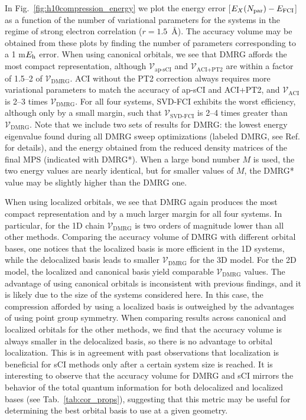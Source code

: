 \documentclass[aip,jcp,amsmath,amssymb, reprint]{revtex4-1}
\newcommand*{\Eh}{$E_{\rm h}$\xspace}
\begin{document}
In Fig.~\ref{fig:h10compression_energy} we plot the energy error [$E_X(N_{\rm{par}}) - E_\mathrm{FCI}$] as a function of the number of variational parameters for the  systems in the regime of strong electron correlation ($r=1.5$~{\AA}).
The accuracy volume may be obtained from these plots by finding the number of parameters corresponding to a 1 m\Eh error.
When using canonical orbitals, we see that DMRG affords the most compact representation, although $\mathcal{V}_{\text{ap-sCI}}$ and $\mathcal{V}_{\text{ACI+PT2}}$   are within a factor of 1.5--2 of $\mathcal{V}_{\text{DMRG}}$.
ACI without the PT2 correction always requires more variational parameters to match the accuracy of ap-sCI and ACI+PT2, and $\mathcal{V}_{\text{ACI}}$ is 2--3 times $\mathcal{V}_{\text{DMRG}}$.
For all four  systems, SVD-FCI exhibits the worst efficiency, although only by a small margin, such that $\mathcal{V}_{\text{SVD-FCI}}$ is 2--4 times greater than $\mathcal{V}_{\text{DMRG}}$.
Note that we include two sets of results for DMRG: the lowest energy eigenvalue found during all DMRG sweep optimizations (labeled DMRG, see Ref.  for details), and the energy obtained from the reduced density matrices of the final MPS (indicated with DMRG*). 
When a large bond number $M$ is used, the two energy values are nearly identical, but for smaller values of $M$, the DMRG* value may be slightly higher than the DMRG one.

When using localized orbitals, we see that DMRG again produces the most compact representation and by a much larger margin for all four  systems.  
In particular, for the 1D chain $\mathcal{V}_{\text{DMRG}}$ is two orders of magnitude lower than all other methods.
Comparing the accuracy volume of DMRG with different orbital bases, one notices that the localized basis is more efficient in the 1D systems, while the delocalized basis leads to smaller $\mathcal{V}_{\text{DMRG}}$ for the 3D model. For the 2D model, the localized and canonical basis yield comparable $\mathcal{V}_{\text{DMRG}}$ values.
The advantage of using canonical orbitals is inconsistent with previous findings,\cite{Olivares2015TheAbinitio} and it is likely due to the size of the systems considered here.
In this case, the compression afforded by using a localized basis is outweighed by the advantages of using point group symmetry.
When comparing results across canonical and localized orbitals for the other methods, we find that the accuracy volume is always smaller in the delocalized basis, so there is no advantage to orbital localization.
This is in agreement with past observations\cite{schriber2018combined} that localization is beneficial for sCI methods only after a certain system size is reached.
It is interesting to observe that the accuracy volume for DMRG and sCI mirrors the behavior of the total quantum information for both delocalized and localized bases (see Tab.~\ref{tab:cor_props}), suggesting that this metric may be useful for determining the best orbital basis to use at a given geometry.
\end{document}
